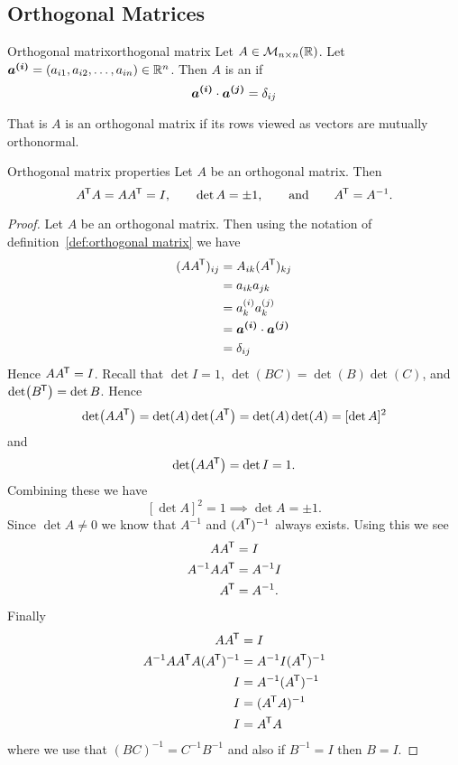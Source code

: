 \subsection{Orthogonal Matrices}
\begin{definition}{Orthogonal matrix}{orthogonal matrix}
    Let \(A\in \mathcal{M}_{{n}\times{n}}({\mathbb{R}})\).
    Let \(\bm{a^{(i)}} = (a_{i1}, a_{i2}, \dotsc, a_{in}) \in\mathbb{R}^n\).
    Then \(A\) is an  if
    \[\bm{a^{(i)}}\cdot\bm{a^{(j)}} = \delta_{ij}\]
\end{definition}
That is \(A\) is an orthogonal matrix if its rows viewed as vectors are mutually orthonormal.
\begin{theorem}{Orthogonal matrix properties}{}
    Let \(A\) be an orthogonal matrix.
    Then
    \[A^{\mkern-1.5mu\mathsf{T}} A = AA^{\mkern-1.5mu\mathsf{T}} = I, \qquad \det A = \pm 1, \qquad\text{and}\qquad A^{\mkern-1.5mu\mathsf{T}} = A^{-1}.\]
\end{theorem}
\begin{proof}
    Let \(A\) be an orthogonal matrix.
    Then using the notation of definition~\ref{def:orthogonal matrix} we have
    \begin{align*}
        (AA^{\mkern-1.5mu\mathsf{T}})_{ij} &= A_{ik}(A^{\mkern-1.5mu\mathsf{T}})_{kj}\\
        &= a_{ik}a_{jk}\\
        &= a^{(i)}_ka^{(j)}_k\\
        &= \bm{a^{(i)}}\cdot\bm{a^{(j)}}\\
        &= \delta_{ij}
    \end{align*}
    Hence \(AA^{\mkern-1.5mu\mathsf{T}} = I\).
    Recall that \(\det I = 1\), \(\det(BC) = \det(B)\det(C)\), and \(\det(B^{\mkern-1.5mu\mathsf{T}}) = \det B\).
    Hence
    \[\det(AA^{\mkern-1.5mu\mathsf{T}}) = \det(A)\det(A^{\mkern-1.5mu\mathsf{T}}) = \det(A)\det(A) = [\det A]^2\]
    and
    \[\det(AA^{\mkern-1.5mu\mathsf{T}}) = \det I = 1.\]
    Combining these we have
    \[[\det A]^2 = 1\implies \det A = \pm 1.\]
    Since \(\det A \ne 0\) we know that \(A^{-1}\) and \((A^{\mkern-1.5mu\mathsf{T}})^{-1}\) always exists.
    Using this we see
    \begin{align*}
        AA^{\mkern-1.5mu\mathsf{T}} &= I\\
        A^{-1}AA^{\mkern-1.5mu\mathsf{T}} &= A^{-1}I\\
        A^{\mkern-1.5mu\mathsf{T}} &= A^{-1}.
    \end{align*}
    Finally
    \begin{align*}
        AA^{\mkern-1.5mu\mathsf{T}} &= I\\
        A^{-1}AA^{\mkern-1.5mu\mathsf{T}} A(A^{\mkern-1.5mu\mathsf{T}})^{-1} &= A^{-1}I(A^{\mkern-1.5mu\mathsf{T}})^{-1}\\
        I &= A^{-1}(A^{\mkern-1.5mu\mathsf{T}})^{-1}\\
        I &= (A^{\mkern-1.5mu\mathsf{T}} A)^{-1}\\
        I &= A^{\mkern-1.5mu\mathsf{T}} A
    \end{align*}
    where we use that \((BC)^{-1} = C^{-1}B^{-1}\) and also if \(B^{-1} = I\) then \(B = I\).
\end{proof}
